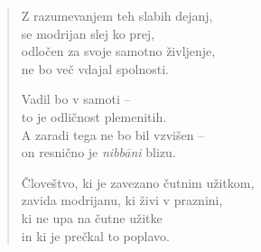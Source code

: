 \begin{verse}
Z razumevanjem teh slabih dejanj,\\
se modrijan slej ko prej,\\
odločen za svoje samotno življenje,\\
ne bo več vdajal spolnosti.

Vadil bo v samoti --\\
to je odličnost plemenitih.\\
A zaradi tega ne bo bil vzvišen --\\
on resnično je \emph{nibbāni} blizu.

Človeštvo, ki je zavezano čutnim užitkom,\\
zavida modrijanu, ki živi v praznini,\\
ki ne upa na čutne užitke\\
in ki je prečkal to poplavo.

\end{verse}


\clearpage
\begin{verse}


\end{verse}


\clearpage
\begin{verse}


\end{verse}

